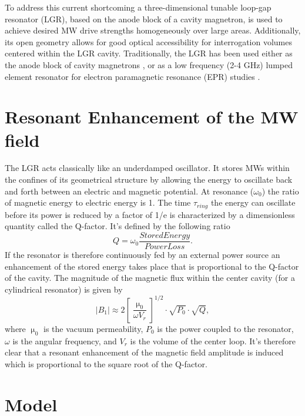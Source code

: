 To address this current shortcoming a three-dimensional tunable loop-gap resonator (LGR), based on the anode block of a cavity magnetron, is used to achieve desired MW drive strengths homogeneously over large areas. Additionally, its open geometry allows for good optical accessibility for interrogation volumes centered within the LGR cavity. Traditionally, the LGR has been used either as the anode block of cavity magnetrons \cite{collins1948microwave}, or as a low frequency (2-4 GHz) lumped element resonator for electron paramagnetic resonance (EPR) studies \cite{rinard2005loopgap}.  

\section{Resonant Enhancement of the MW field}\label{resonant_enhc}

The LGR acts classically like an underdamped oscillator. It stores MWs within the confines of its geometrical structure by allowing the energy to oscillate back and forth between an electric and magnetic potential. At resonance ($\omega_0$) the ratio of magnetic energy to electric energy is 1. The time $\tau_{ring}$ the energy can oscillate before its power is reduced by a factor of 1/e is characterized by a dimensionless quantity called the Q-factor. It's defined by the following ratio
\begin{equation}
Q = \omega_0 \frac{Stored Energy}{Power Loss}.
\end{equation}
If the resonator is therefore continuously fed by an external power source an enhancement of the stored energy takes place that is proportional to the Q-factor of the cavity. The magnitude of the magnetic flux within the center cavity (for a cylindrical resonator) is given by
\begin{equation}
|B_1| \approx  2\left[\frac{\upmu_0}{\omega V_r}\right]^{1/2} \cdot \sqrt{P_0} \cdot \sqrt{Q},
\end{equation}
where $\upmu_0$ is the vacuum permeability, $P_0$ is the power coupled to the resonator, $\omega$ is the angular frequency, and $V_r$ is the volume of the center loop. It's therefore clear that a resonant enhancement of the magnetic field amplitude is induced which is proportional to the square root of the Q-factor. 


\section{Model}

